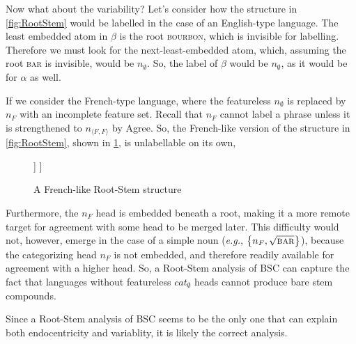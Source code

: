 \documentclass[MilwayThesis]{subfiles}
\begin{document}
Now what about the variability?
Let's consider how the structure in \cref{fig:RootStem} would be labelled in the case of an English-type language.
The least embedded atom in $\beta$ is the root \textsc{bourbon}, which is invisible for labelling.
Therefore we must look for the next-least-embedded atom, which, assuming the root \textsc{bar} is invisible, would be $n_{\emptyset}$.
So, the label of $\beta$ would be $n_{\emptyset}$, as it would be for $\alpha$ as well.

If we consider the French-type language, where the featureless $n_{\emptyset}$ is replaced by $n_{F}$ with an incomplete feature set.
Recall that $n_{F}$ cannot label a phrase unless it is strengthened to $n_{\langle F,F\rangle}$ by Agree.
So, the French-like version of the structure in \cref{fig:RootStem}, shown in \cref{fig:RootStemFrench}, is unlabellable on its own,
\begin{figure}[h]
	\centering
	\begin{forest}
		[$\beta$
			[$\sqrt{\textsc{bourbon}}$]
			[$\alpha$
				[$n_{F}$]
				[$\sqrt{\textsc{bar}}$]
			]
		]
	\end{forest}
	\caption{A French-like Root-Stem structure}
	\label{fig:RootStemFrench}
\end{figure}
Furthermore, the $n_{F}$ head is embedded beneath a root, making it a more remote target for agreement with some head to be merged later.
This difficulty would not, however, emerge in the case of a simple noun (\textit{e.g.}, $\left\{ n_{F}, \sqrt{\textsc{bar}} \right\}$), because the categorizing head $n_{F}$ is not embedded, and therefore readily available for agreement with a higher head.
So, a Root-Stem analysis of BSC can capture the fact that languages without featureless $cat_{\emptyset}$ heads cannot produce bare stem compounds.

Since a Root-Stem analysis of BSC seems to be the only one that can explain both endocentricity and variablity, it is likely the correct analysis.
\end{document}

